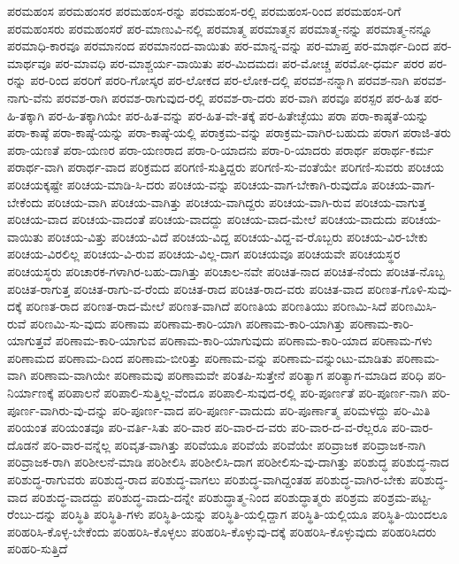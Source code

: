 {ಪರಮಹಂಸ
ಪರಮಹಂಸರ
ಪರಮಹಂಸ-ರನ್ನು
ಪರಮಹಂಸ-ರಲ್ಲಿ
ಪರಮಹಂಸ-ರಿಂದ
ಪರಮಹಂಸ-ರಿಗೆ
ಪರಮಹಂಸರು
ಪರಮಹಂಸರೆ
ಪರ-ಮಾಣುವಿ-ನಲ್ಲಿ
ಪರಮಾತ್ಮ
ಪರಮಾತ್ಮನ
ಪರಮಾತ್ಮ-ನನ್ನು
ಪರಮಾತ್ಮ-ನನ್ನೂ
ಪರಮಾಧಿ-ಕಾರವೂ
ಪರಮಾನಂದ
ಪರಮಾನಂದ-ವಾಯಿತು
ಪರ-ಮಾನ್ನ-ವನ್ನು
ಪರ-ಮಾಪ್ತ
ಪರ-ಮಾರ್ಥ-ದಿಂದ
ಪರ-ಮಾರ್ಥವೂ
ಪರ-ಮಾವಧಿ
ಪರ-ಮಾಶ್ಚರ್ಯ-ವಾಯಿತು
ಪರ-ಮಿದಮದಃ
ಪರ-ಮೋಚ್ಚ
ಪರಮೋ-ಧರ್ಮ
ಪರರ
ಪರ-ರನ್ನು
ಪರ-ರಿಂದ
ಪರರಿಗೆ
ಪರರಿ-ಗೋಸ್ಕರ
ಪರ-ಲೋಕದ
ಪರ-ಲೋಕ-ದಲ್ಲಿ
ಪರವಶ-ನನ್ನಾಗಿ
ಪರವಶ-ನಾಗಿ
ಪರವಶ-ನಾಗು-ವೆನು
ಪರವಶ-ರಾಗಿ
ಪರವಶ-ರಾಗುವುದ-ರಲ್ಲಿ
ಪರವಶ-ರಾ-ದರು
ಪರ-ವಾಗಿ
ಪರವೂ
ಪರಸ್ಪರ
ಪರ-ಹಿತ
ಪರ-ಹಿ-ತಕ್ಕಾಗಿ
ಪರ-ಹಿ-ತಕ್ಕಾಗಿಯೇ
ಪರ-ಹಿತ-ವನ್ನು
ಪರ-ಹಿತ-ವೇ-ತಕ್ಕೆ
ಪರ-ಹಿತೇಚ್ಛೆಯು
ಪರಾ
ಪರಾ-ಕಾಷ್ಠತೆ-ಯನ್ನು
ಪರಾ-ಕಾಷ್ಠೆ
ಪರಾ-ಕಾಷ್ಠೆ-ಯನ್ನು
ಪರಾ-ಕಾಷ್ಠೆ-ಯಲ್ಲಿ
ಪರಾಕ್ರಮ-ವನ್ನು
ಪರಾಕ್ರಮ-ವಾಗಿರ-ಬಹುದು
ಪರಾಗ
ಪರಾಜಿ-ತರು
ಪರಾ-ಯಣತೆ
ಪರಾ-ಯಣರ
ಪರಾ-ಯಣರಾದ
ಪರಾ-ರಿ-ಯಾದನು
ಪರಾ-ರಿ-ಯಾದರು
ಪರಾರ್ಥ
ಪರಾರ್ಥ-ಕರ್ಮ
ಪರಾರ್ಥ-ವಾಗಿ
ಪರಾರ್ಥ-ವಾದ
ಪರಿಕ್ರಮದ
ಪರಿಗಣಿ-ಸುತ್ತಿದ್ದರು
ಪರಿಗಣಿ-ಸು-ವಂತೆಯೇ
ಪರಿಗಣಿ-ಸುವರು
ಪರಿಚಯ
ಪರಿಚಯಕ್ಕಷ್ಟೇ
ಪರಿಚಯ-ಮಾಡಿ-ಸಿ-ದರು
ಪರಿಚಯ-ವನ್ನು
ಪರಿಚಯ-ವಾಗ-ಬೇಕಾಗಿ-ರುವುದೊ
ಪರಿಚಯ-ವಾಗ-ಬೇಕೆಂದು
ಪರಿಚಯ-ವಾಗಿ
ಪರಿಚಯ-ವಾಗಿತ್ತು
ಪರಿಚಯ-ವಾಗಿದ್ದರು
ಪರಿಚಯ-ವಾಗಿ-ರುವ
ಪರಿಚಯ-ವಾಗುತ್ತ
ಪರಿಚಯ-ವಾದ
ಪರಿಚಯ-ವಾದಂತೆ
ಪರಿಚಯ-ವಾದದ್ದು
ಪರಿಚಯ-ವಾದ-ಮೇಲೆ
ಪರಿಚಯ-ವಾದುದು
ಪರಿಚಯ-ವಾಯಿತು
ಪರಿಚಯ-ವಿತ್ತು
ಪರಿಚಯ-ವಿದೆ
ಪರಿಚಯ-ವಿದ್ದ
ಪರಿಚಯ-ವಿದ್ದ-ವ-ರೊಬ್ಬರು
ಪರಿಚಯ-ವಿರ-ಬೇಕು
ಪರಿಚಯ-ವಿರಲಿಲ್ಲ
ಪರಿಚಯ-ವಿ-ರುವ
ಪರಿಚಯ-ವಿಲ್ಲ-ದಾಗ
ಪರಿಚಯವೂ
ಪರಿಚಯವೇ
ಪರಿಚಯಸ್ಥರ
ಪರಿಚಯಸ್ಥರು
ಪರಿಚಾರಕ-ಗಳಾಗಿರ-ಬಹು-ದಾಗಿತ್ತು
ಪರಿಚಾಲ-ನವೇ
ಪರಿಚಿತ-ನಾದ
ಪರಿಚಿತ-ನೆಂದು
ಪರಿಚಿತ-ನೊಬ್ಬ
ಪರಿಚಿತ-ರಾಗುತ್ತ
ಪರಿಚಿತ-ರಾಗು-ವ-ರೆಂದು
ಪರಿಚಿತ-ರಾದ
ಪರಿಚಿತ-ರಾದ-ವರು
ಪರಿಚಿತ-ವಾದ
ಪರಿಣತ-ಗೊಳಿ-ಸುವು-ದಕ್ಕೆ
ಪರಿಣತ-ರಾದ
ಪರಿಣತ-ರಾದ-ಮೇಲೆ
ಪರಿಣತ-ವಾಗಿದೆ
ಪರಿಣತಿಯ
ಪರಿಣತಿಯು
ಪರಿಣಮಿ-ಸಿದೆ
ಪರಿಣಮಿಸಿ-ರುವೆ
ಪರಿಣಮಿ-ಸು-ವುದು
ಪರಿಣಾಮ
ಪರಿಣಾಮ-ಕಾರಿ-ಯಾಗಿ
ಪರಿಣಾಮ-ಕಾರಿ-ಯಾಗಿತ್ತು
ಪರಿಣಾಮ-ಕಾರಿ-ಯಾಗುತ್ತವೆ
ಪರಿಣಾಮ-ಕಾರಿ-ಯಾಗುವ
ಪರಿಣಾಮ-ಕಾರಿ-ಯಾಗುವುದು
ಪರಿಣಾಮ-ಕಾರಿ-ಯಾದ
ಪರಿಣಾಮ-ಗಳು
ಪರಿಣಾಮದ
ಪರಿಣಾಮ-ದಿಂದ
ಪರಿಣಾಮ-ಬೀರಿತ್ತು
ಪರಿಣಾಮ-ವನ್ನು
ಪರಿಣಾಮ-ವನ್ನುಂಟು-ಮಾಡಿತು
ಪರಿಣಾಮ-ವಾಗಿ
ಪರಿಣಾಮ-ವಾಗಿಯೇ
ಪರಿಣಾಮವು
ಪರಿಣಾಮವೇ
ಪರಿತಪಿ-ಸುತ್ತೇನೆ
ಪರಿತ್ಯಾಗ
ಪರಿತ್ಯಾಗ-ಮಾಡಿದ
ಪರಿಧಿ
ಪರಿ-ನಿರ್ಯಾಣಕ್ಕೆ
ಪರಿಪಾಲನೆ
ಪರಿಪಾಲಿ-ಸುತ್ತಿಲ್ಲ-ವೆಂದೂ
ಪರಿಪಾಲಿ-ಸುವುದ-ರಲ್ಲಿ
ಪರಿ-ಪೂರ್ಣತೆ
ಪರಿ-ಪೂರ್ಣ-ನಾಗಿ
ಪರಿ-ಪೂರ್ಣ-ವಾಗಿರು-ವು-ದನ್ನು
ಪರಿ-ಪೂರ್ಣ-ವಾದ
ಪರಿ-ಪೂರ್ಣ-ವಾದುದು
ಪರಿ-ಪೂರ್ಣಾತ್ಮ
ಪರಿಮಳದ್ದು
ಪರಿ-ಮಿತಿ
ಪರಿಯಂತ
ಪರಿಯಂತವೂ
ಪರಿ-ವರ್ತಿ-ಸಿತು
ಪರಿ-ವಾರ
ಪರಿ-ವಾರ-ದ-ವರು
ಪರಿ-ವಾರ-ದ-ವ-ರೆಲ್ಲರೂ
ಪರಿ-ವಾರ-ದೊಡನೆ
ಪರಿ-ವಾರ-ವನ್ನೆಲ್ಲ
ಪರಿವೃತ-ವಾಗಿತ್ತು
ಪರಿವೆಯೂ
ಪರಿವೆಯೆ
ಪರಿವೆಯೇ
ಪರಿವ್ರಾಜಕ
ಪರಿವ್ರಾಜಕ-ನಾಗಿ
ಪರಿವ್ರಾಜಕ-ರಾಗಿ
ಪರಿಶೀಲನೆ-ಮಾಡಿ
ಪರಿಶೀಲಿಸಿ
ಪರಿಶೀಲಿಸಿ-ದಾಗ
ಪರಿಶೀಲಿಸು-ವು-ದಾಗಿತ್ತು
ಪರಿಶುದ್ಧ
ಪರಿಶುದ್ಧ-ನಾದ
ಪರಿಶುದ್ಧ-ರಾಗುವರು
ಪರಿಶುದ್ಧ-ರಾದ
ಪರಿಶುದ್ಧ-ವಾಗಲು
ಪರಿಶುದ್ಧ-ವಾಗಿದ್ದಂತಹ
ಪರಿಶುದ್ಧ-ವಾಗಿರ-ಬೇಕು
ಪರಿಶುದ್ಧ-ವಾದ
ಪರಿಶುದ್ಧ-ವಾದದ್ದು
ಪರಿಶುದ್ಧ-ವಾದು-ದನ್ನೇ
ಪರಿಶುದ್ಧಾತ್ಮ-ನಿಂದ
ಪರಿಶುದ್ಧಾತ್ಮರು
ಪರಿಶ್ರಮ
ಪರಿಶ್ರಮ-ಪಟ್ಟ-ರೆಂಬು-ದನ್ನು
ಪರಿಸ್ಥಿತಿ
ಪರಿಸ್ಥಿತಿ-ಗಳು
ಪರಿಸ್ಥಿತಿ-ಯನ್ನು
ಪರಿಸ್ಥಿತಿ-ಯಲ್ಲಿದ್ದಾಗ
ಪರಿಸ್ಥಿತಿ-ಯಲ್ಲಿಯೂ
ಪರಿಸ್ಥಿತಿ-ಯಿಂದಲೂ
ಪರಿಹರಿಸಿ-ಕೊಳ್ಳ-ಬೇಕೆಂದು
ಪರಿಹರಿಸಿ-ಕೊಳ್ಳಲು
ಪರಿಹರಿಸಿ-ಕೊಳ್ಳುವು-ದಕ್ಕೆ
ಪರಿಹರಿಸಿ-ಕೊಳ್ಳುವುದು
ಪರಿಹರಿಸಿದರು
ಪರಿಹರಿ-ಸುತ್ತಿದೆ
}

